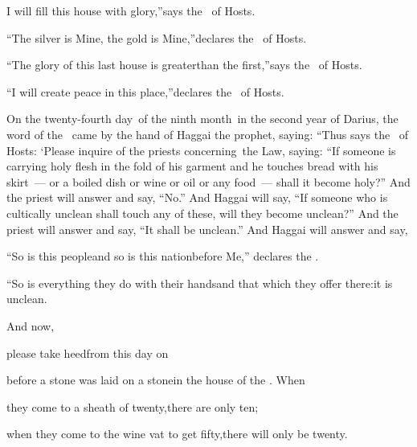 \begin{inparaenum}
  \pd I will fill this house with glory,''\pa says the \lord\ of Hosts.%
  
  \pc {} ``The silver is Mine, the gold is Mine,''\pa declares the \lord\ of Hosts.%
  
  \pc {} ``The glory of this last%
  house is greater\pa than the first,''\pa says the \lord\ of Hosts.%
  
  \pd ``I will create peace in this place,''\pa declares the \lord\ of Hosts.%
  
   On the twenty-fourth day\understood\ of the ninth month\understood\ in the second year of Darius, the word of the \lord\ came by the hand of Haggai the prophet, saying:%
   ``Thus says the \lord\ of Hosts: `Please inquire of the priests concerning\understood\ the Law, saying:%
   ``If someone is carrying holy flesh in the fold of his garment and he touches bread with his skirt~--- or a boiled dish or wine or oil or any food~--- shall it become holy?'' And the priest will answer and say, ``No.''%
   And Haggai will say, ``If someone who is cultically unclean shall touch any of these, will they become unclean?'' And the priest will answer and say, ``It shall be unclean.''%
   And Haggai will answer and say,\smallskip%
  
  \pd ``So is this people\pa and so is this nation\pa before Me,'' declares the \lord.%
  
  \pd ``So is everything they do with their hands\pa and that which they offer there:\pa it is unclean.%
  
  \pa {} And now,%
  
  \pa please take heed\pa from this day on%
  
  \pa before a stone was laid on a stone\pa in the house of the \lord.  When%
  
  \pa they come to a sheath of twenty,\pa there are only ten;%
  
  \pa when they come to the wine vat to get fifty,\pa there will only be twenty.%
  

\end{inparaenum}
